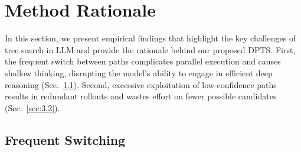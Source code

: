 \section{Method Rationale}

\label{sec:motivation}

 


{
In this section, we present empirical findings that highlight the key challenges of tree search in LLM and provide the rationale behind our proposed DPTS. 
}
First, the frequent switch between paths complicates parallel execution and causes shallow thinking, disrupting the model’s ability to engage in efficient deep reasoning (Sec.~\ref{sec:3.1}). 
Second, excessive exploitation of low-confidence paths results in redundant rollouts and wastes effort on fewer possible candidates (Sec.~\ref{sec:3.2}). 

\subsection{Frequent Switching}
\label{sec:3.1}

